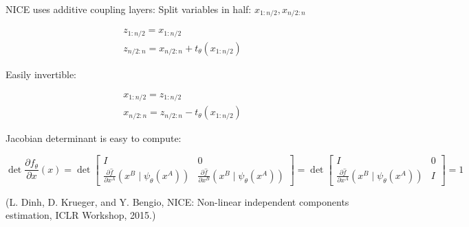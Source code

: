 \begin{definition}
    NICE uses additive coupling layers:
    Split variables in half: $x_{1: n / 2}, x_{n / 2: n}$

    $$
    \begin{aligned}
    & z_{1: n / 2}=x_{1: n / 2} \\
    & z_{n / 2: n}=x_{n / 2: n}+t_{\theta}\left(x_{1: n / 2}\right)
    \end{aligned}
    $$

    Easily invertible:

    $$
    \begin{aligned}
    & x_{1: n / 2}=z_{1: n / 2} \\
    & x_{n / 2: n}=z_{n / 2: n}-t_{\theta}\left(x_{1: n / 2}\right)
    \end{aligned}
    $$

    Jacobian determinant is easy to compute:

    $$
    \operatorname{det} \frac{\partial f_{\theta}}{\partial x}(x)=\operatorname{det}\left[\begin{array}{cc}I & 0 \\ \frac{\partial \hat{f}}{\partial x^{A}}\left(x^{B} \mid \psi_{\theta}\left(x^{A}\right)\right) & \frac{\partial \hat{f}}{\partial x^{B}}\left(x^{B} \mid \psi_{\theta}\left(x^{A}\right)\right)\end{array}\right]=\operatorname{det}\left[\begin{array}{cc}I & 0 \\ \frac{\partial \hat{f}}{\partial x^{A}}\left(x^{B} \mid \psi_{\theta}\left(x^{A}\right)\right) & I\end{array}\right]=1
    $$

    (L. Dinh, D. Krueger, and Y. Bengio, NICE: Non-linear independent components estimation, ICLR Workshop, 2015.)
\end{definition}

